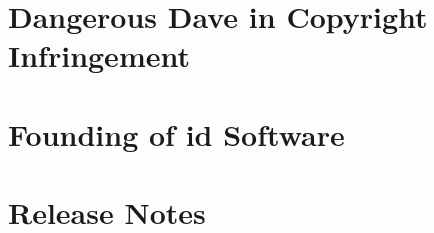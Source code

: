 \documentclass[8pt]{book}
\begin{document}
	\chapter{Dangerous Dave in Copyright Infringement}
        
        
    \chapter{Founding of id Software}
        
        
    \chapter{Release Notes}
        

  
    \cleartoleftpage
    \thispagestyle{plain} \blankpage
    \thispagestyle{plain} \blankpage
    \thispagestyle{plain} \blankpage
\end{document}
